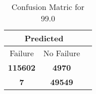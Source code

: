 \begin{table}[] 
\caption{Confusion Matric for 99.0} 
\label{Table: Prediction Accuracy-DMD99.0OnlySunEKF-resetReflectionEKF-top2-Reflection} 
\centering 
\begin{tabular} 
 {@{}ccc@{}} 
\toprule 
\multicolumn{2}{c}{\textbf{Predicted}}
 \\ \midrule 
\multicolumn{1}{|c|}{Failure} & 
\multicolumn{1}{c|}{No Failure}
 \\ \midrule 
\multicolumn{1}{|c|}{\color{green}\textbf{115602}} & 
\multicolumn{1}{c|}{\color{red}\textbf{4970}}
 \\ \midrule 
\multicolumn{1}{|c|}{\color{red}\textbf{7}} & 
\multicolumn{1}{c|}{\color{green}\textbf{49549}}
 \\ \bottomrule 
\end{tabular} 
\end{table} 
